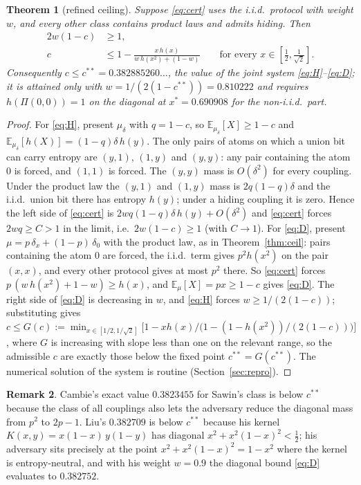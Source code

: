 \documentclass[11pt]{article}
\newtheorem{theorem}{Theorem}
\theoremstyle{definition}
\newtheorem{remark}[theorem]{Remark}
\newcommand{\E}{\mathbb{E}}
\newcommand{\ent}{h}
\begin{document}
\begin{theorem}[refined ceiling]\label{thm:refined}
Suppose \eqref{eq:cert} uses the i.i.d.\ protocol with weight $w$, and every other class contains product laws and admits hiding. Then
\begin{align}
2w(1-c)&\ge1,\label{eq:H}\\
c&\le 1-\frac{x\,\ent(x)}{w\,\ent(x^2)+(1-w)}\qquad\text{for every }x\in[\tfrac12,\tfrac1{\sqrt2}].\label{eq:D}
\end{align}
Consequently $c\le c^{**}=0.382885260\ldots$, the value of the joint system \eqref{eq:H}--\eqref{eq:D}; it is attained only with $w=1/(2(1-c^{**}))=0.810222$ and requires $\ent(\Pi(0,0))=1$ on the diagonal at $x^*=0.690908$ for the non-i.i.d.\ part.
\end{theorem}
\begin{proof}
For \eqref{eq:H}, present $\mu_\delta$ with $q=1-c$, so $\E_{\mu_\delta}[X]\ge1-c$ and $\E_{\mu_\delta}[\ent(X)]=(1-q)\delta\,\ent(y)$. The only pairs of atoms on which a union bit can carry entropy are $(y,1)$, $(1,y)$ and $(y,y)$: any pair containing the atom $0$ is forced, and $(1,1)$ is forced. The $(y,y)$ mass is $O(\delta^2)$ for every coupling. Under the product law the $(y,1)$ and $(1,y)$ mass is $2q(1-q)\delta$ and the i.i.d.\ union bit there has entropy $\ent(y)$; under a hiding coupling it is zero. Hence the left side of \eqref{eq:cert} is $2wq(1-q)\delta\,\ent(y)+O(\delta^2)$ and \eqref{eq:cert} forces $2wq\ge C>1$ in the limit, i.e.\ $2w(1-c)\ge1$ (with $C\to1$). For \eqref{eq:D}, present $\mu=p\,\delta_x+(1-p)\,\delta_0$ with the product law, as in Theorem~\ref{thm:ceil}: pairs containing the atom $0$ are forced, the i.i.d.\ term gives $p^2\ent(x^2)$ on the pair $(x,x)$, and every other protocol gives at most $p^2$ there. So \eqref{eq:cert} forces $p\,(w\,\ent(x^2)+1-w)\ge\ent(x)$, and $\E_\mu[X]=px\ge1-c$ gives \eqref{eq:D}. The right side of \eqref{eq:D} is decreasing in $w$, and \eqref{eq:H} forces $w\ge1/(2(1-c))$; substituting gives $c\le G(c):=\min_{x\in[1/2,1/\sqrt2]}\big[1-x\ent(x)\big/\big(1-(1-\ent(x^2))/(2(1-c))\big)\big]$, where $G$ is increasing with slope less than one on the relevant range, so the admissible $c$ are exactly those below the fixed point $c^{**}=G(c^{**})$. The numerical solution of the system is routine (Section~\ref{sec:repro}).
\end{proof}

\begin{remark}
Cambie's exact value $0.3823455$ for Sawin's class is below $c^{**}$ because the class of all couplings also lets the adversary reduce the diagonal mass from $p^2$ to $2p-1$. Liu's $0.382709$ is below $c^{**}$ because his kernel $K(x,y)=x(1-x)\,y(1-y)$ has diagonal $x^2+x^2(1-x)^2<\frac12$; his adversary sits precisely at the point $x^2+x^2(1-x)^2=1-x^2$ where the kernel is entropy-neutral, and with his weight $w=0.9$ the diagonal bound \eqref{eq:D} evaluates to $0.382752$.
\end{remark}
\end{document}
